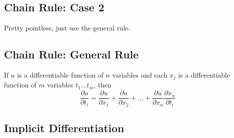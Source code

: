 \documentclass[a4paper,12pt]{report}
\begin{document}
\subsection{Chain Rule: Case 2}
Pretty pointless, just use the general rule.

\subsection{Chain Rule: General Rule} 
If $u$ is a differentiable function of $n$ variables and each $x_j$ is a differentiable function of $m$ variables $t_1 ... t_m$, then
$$\frac{\partial u}{\partial t_i} = \frac{\partial u}{\partial x_1} + \frac{\partial u}{\partial x_2} + ... + \frac{\partial u}{\partial x_n} \frac{\partial x_n}{\partial t_i}$$

\subsection{Implicit Differentiation}
\end{document}
